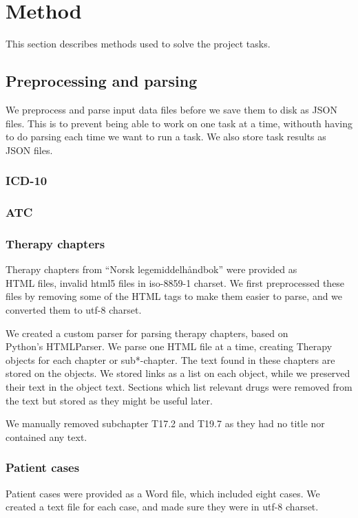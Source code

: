 \chapter{Method}
This section describes methods used to solve the project tasks.


\section{Preprocessing and parsing}
We preprocess and parse input data files before we save them to disk as JSON
files. This is to prevent being able to work on one task at a time, withouth
having to do parsing each time we want to run a task. We also store task
results as JSON files.

\subsection{ICD-10}

\subsection{ATC}

\subsection{Therapy chapters}
Therapy chapters from ``Norsk legemiddelhåndbok'' were provided as\\
HTML files, invalid html5 files in iso-8859-1 charset. We first preprocessed
these files by removing some of the HTML tags to make them easier to parse,
and we converted them to utf-8 charset.

We created a custom parser for parsing therapy chapters, based on\\
Python's HTMLParser. We parse one HTML file at a time, creating Therapy
objects for each chapter or sub*-chapter. The text found in these chapters are
stored on the objects. We stored links as a list on each object, while we
preserved their text in the object text. Sections which list relevant drugs
were removed from the text but stored as they might be useful later.

We manually removed subchapter T17.2 and T19.7 as they had no title nor
contained any text.

\subsection{Patient cases}
Patient cases were provided as a Word file, which included eight cases. We
created a text file for each case, and made sure they were in utf-8 charset.


